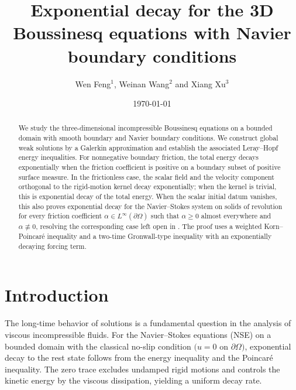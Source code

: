 \documentclass[11pt,reqno]{amsart}
\title[Decay of the 3D Boussinesq system]{Exponential decay for the 3D Boussinesq equations with Navier boundary conditions}
\author[Wen Feng, Weinan Wang and Xiang Xu]{Wen Feng$^{1}$, Weinan Wang$^{2}$ and  Xiang Xu$^{3}$}
\date{\today}
\theoremstyle{plain}
\numberwithin{equation}{section}
\begin{document}
\begin{abstract}
We study the three-dimensional incompressible Boussinesq equations on a bounded
domain with smooth boundary and Navier boundary conditions. We construct global weak
solutions by a Galerkin approximation and establish the associated Leray--Hopf
energy inequalities. For nonnegative boundary friction, the total energy
decays exponentially when the friction coefficient is positive on a
boundary subset of positive surface measure. In the frictionless case, the
scalar field and the velocity component orthogonal to the rigid-motion kernel
decay exponentially; when the kernel is trivial, this is exponential decay of
the total energy. 
When the scalar initial datum vanishes, this also proves exponential decay
for the Navier--Stokes system on solids of revolution for every friction
coefficient $\alpha\in L^\infty(\partial\Omega)$ such that $\alpha\ge0$ almost
everywhere and $\alpha\not\equiv0$, resolving the
corresponding case left open in \cite{Kelliher2025}. The proof uses a weighted Korn--Poincar\'e
inequality and a two-time Gronwall-type inequality with an exponentially
decaying forcing term.
\end{abstract}
\maketitle

\section{Introduction}

The long-time behavior of solutions is a fundamental question in the analysis of viscous incompressible fluids. For the Navier--Stokes equations (NSE) on a bounded domain with the classical no-slip condition $(u=0$ on $\partial\Omega)$, exponential decay to the rest state follows from the energy inequality and the Poincar\'e inequality. The zero trace excludes undamped rigid motions and controls the kinetic energy by the viscous dissipation, yielding a uniform decay rate.
\end{document}
